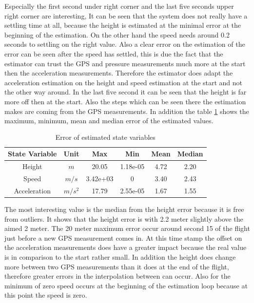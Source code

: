 Especially the first second under right corner and the last five seconds upper right corner are interesting,
It can be seen that the system does not really have a settling time at all,
because the height is estimated at the minimal error at the beginning of the estimation.
On the other hand the speed needs around 0.2 seconds to settling on the right value.
Also a clear error on the estimation of the error can be seen after the speed has settled,
this is due the fact that the estimator can trust the GPS and pressure measurements much more at the start then the acceleration measurements.
Therefore the estimator does adapt the acceleration estimation on the height and speed estimation at the start and not the other way around.
In the last five second it can be seen that the height is far more off then at the start.
Also the steps which can be seen there the estimation makes are coming from the GPS measurements.
In addition the table \ref{tab:ErrorPointMass} shows the maximum, minimum, mean and median error of the estimated values.

\begin{table}[h!]
\centering
\begin{tabular}{cccccc}
\hline
\multicolumn{1}{|c|}{State Variable} & \multicolumn{1}{c|}{Unit} & \multicolumn{1}{c|}{Max} & \multicolumn{1}{c|}{Min} & \multicolumn{1}{c|}{Mean} & \multicolumn{1}{c|}{Median} \\ \hline
Height                            & $m$                         & 20.05                  & 1.18e-05                 & 4.72                    & 2.20                      \\
Speed                             & $m/s$                       & 3.42e+03               & 0                        & 3.40                    & 2.43                      \\
Acceleration                       & $m/s^2$   			& 17.79                  & 2.55e-05                 & 1.67                    & 1.55                     
\end{tabular}
\caption{Error of estimated state variables}
\label{tab:ErrorPointMass}
\end{table}

The most interesting value is the median from the height error because it is free from outliers.
It shows that the height error is with 2.2 meter slightly above the aimed 2 meter.
The 20 meter maximum error occur around second 15 of the flight just before a new GPS measurement comes in.
At this time stamp the offset on the acceleration measurements does have a greater impact because the real value is in comparison to the start rather small.
In addition the height does change more between two GPS measurements than it does at the end of the flight, therefore greater errors in the interpolation between can occur.
Also for the minimum of zero speed occurs at the beginning of the estimation loop because at this point the speed is zero.


